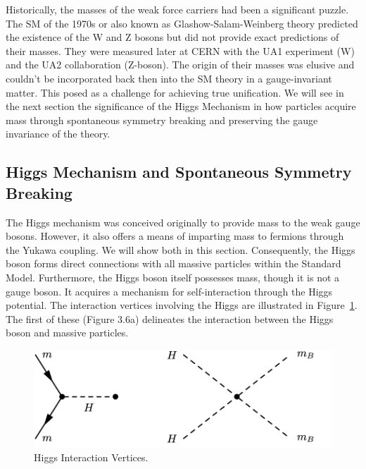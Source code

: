 Historically, the masses of the weak force carriers had been a significant puzzle. The SM of the 1970s or also known as Glashow-Salam-Weinberg theory predicted the existence of the W and Z bosons but did not provide exact predictions of their masses. They were measured later at CERN with the UA1 experiment (W) and the UA2 collaboration (Z-boson). The origin of their masses was elusive and couldn't be incorporated back then into the SM theory in a gauge-invariant matter. This posed as a challenge for achieving true unification. We will see in the next section the significance of the Higgs Mechanism in how particles acquire mass through spontaneous symmetry breaking and preserving the gauge invariance of the theory.




\subsection{Higgs Mechanism and Spontaneous Symmetry Breaking} \label{sec:HiggsMechanism}

The Higgs mechanism was conceived originally to provide mass to the weak gauge bosons. However, it also offers a means of imparting mass to fermions through the Yukawa coupling. We will show both in this section. Consequently, the Higgs boson forms direct connections with all massive particles within the Standard Model. Furthermore, the Higgs boson itself possesses mass, though it is not a gauge boson. It acquires a mechanism for self-interaction through the Higgs potential. The interaction vertices involving the Higgs are illustrated in Figure~\ref{fig:HiggsVertices}. The first of these (Figure 3.6a) delineates the interaction between the Higgs boson and massive particles. 

\begin{figure}[!htbp]
	\centering
     \label{fig:HiggsVertices}
    \includegraphics[scale=1.0]{fig/HiggsInteraction.png}
	\caption{Higgs Interaction Vertices.}
\end{figure}

